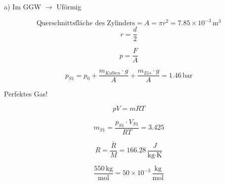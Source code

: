 a) Im GGW $\rightarrow$ Uförmig

\[
\text{Querschnittsfläche des Zylinders} = A = \pi r^2 = 7.85 \times 10^{-3} \, \text{m}^3
\]
\[
r = \frac{d}{2}
\]

\[
p = \frac{F}{A}
\]

\[
p_{S1} = p_0 + \frac{m_{Kolben} \cdot g}{A} + \frac{m_{Eis} \cdot g}{A} = 1.46 \, \text{bar}
\]

Perfektes Gas!

\[
p V = m RT
\]

\[
m_{S1} = \frac{p_{S1} \cdot V_{S1}}{RT} = 3.425
\]

\[
R = \frac{\bar{R}}{M} = 166.28 \, \frac{J}{\text{kg} \cdot \text{K}}
\]

\[
\frac{550 \, \text{kg}}{\text{mol}} = 50 \times 10^{-3} \, \frac{\text{kg}}{\text{mol}}
\]